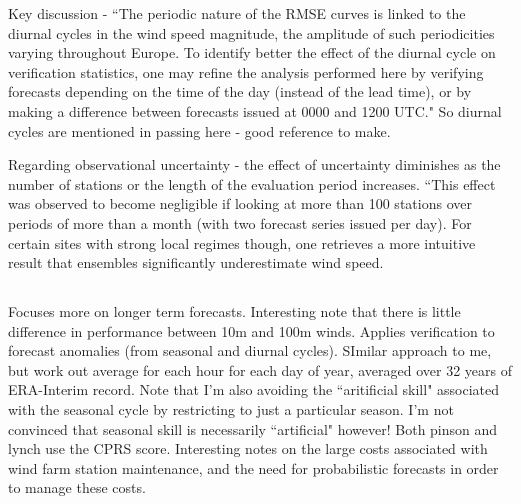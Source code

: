 \documentclass[alpha-refs]{wiley-article}
\begin{document}
Key discussion - ``The periodic nature of the RMSE curves is linked to the diurnal cycles in the wind speed magnitude, the amplitude of such periodicities varying throughout Europe. To identify better the effect of the diurnal cycle on verification statistics, one may refine the analysis performed here by verifying forecasts depending on the time of the day (instead of the lead time), or by making a difference between forecasts issued at 0000 and 1200 UTC." So diurnal cycles are mentioned in passing here - good reference to make.  

Regarding observational uncertainty - the effect of uncertainty diminishes as the number of stations or the length of the evaluation period increases. ``This effect was observed to become negligible if looking at more than 100 stations over periods of more than a month (with two forecast series issued per day). For certain sites with strong local regimes though, one retrieves a more intuitive result that ensembles significantly underestimate wind speed.  

\subsection{\citet{lynch14}}
Focuses more on longer term forecasts. Interesting note that there is little difference in performance between 10m and 100m winds. Applies verification to forecast anomalies (from seasonal and diurnal cycles). SImilar approach to me, but work out average for each hour for each day of year, averaged over 32 years of ERA-Interim record. Note that I'm also avoiding the ``aritificial skill" associated with the seasonal cycle by restricting to just a particular season. I'm not convinced that seasonal skill is necessarily ``artificial" however! Both pinson and lynch use the CPRS score. Interesting notes on the large costs associated with wind farm station maintenance, and the need for probabilistic forecasts in order to manage these costs. 
\end{document}
